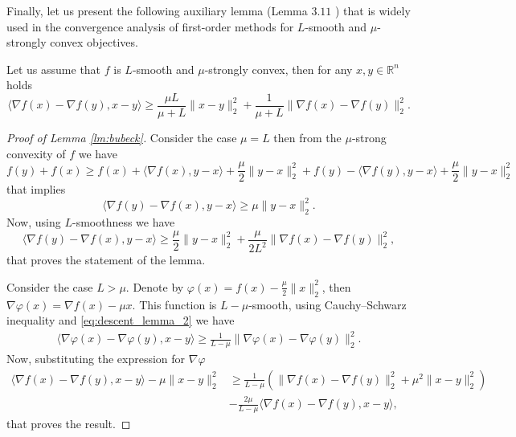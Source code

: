{\color{blue}
Finally, let us present the following auxiliary lemma (Lemma $3.11$ \cite{bubeck2015convex}) that is widely used in the convergence analysis of first-order methods for $L$-smooth and $\mu$-strongly convex objectives.

\begin{lemma}\label{lm:bubeck}
Let us assume that $f$ is $L$-smooth and $\mu$-strongly convex, then for any $x,y\in\mathbb{R}^n$ holds
\begin{equation}\label{eq:bubeck}
\langle \nabla f(x)- \nabla f(y), x - y\rangle\geq \frac{\mu L}{\mu + L}\|x-y\|_2^2 + \frac{1}{\mu + L}\|\nabla f(x) - \nabla f(y)\|_2^2.
\end{equation}
\end{lemma}
\begin{proof}[Proof of Lemma \ref{lm:bubeck}]
Consider the case $\mu = L$ then from the $\mu$-strong convexity of $f$ we have
$$
f(y) + f(x) \geq f(x) + \langle \nabla f(x), y-x\rangle + \frac{\mu}{2}\|y-x\|_2^2 + f(y) - \langle \nabla f(y), y-x\rangle + \frac{\mu}{2}\|y-x\|_2^2
$$
that implies 
\begin{equation}
    \langle \nabla f(y) - \nabla f(x), y-x\rangle\geq \mu\|y-x\|_2^2.
\end{equation}
Now, using $L$-smoothness we have
\begin{equation}
    \langle \nabla f(y) - \nabla f(x), y-x\rangle\geq \frac{\mu}{2}\|y-x\|_2^2 + \frac{\mu}{2L^2}\|\nabla f(x) - \nabla f(y)\|_2^2,
\end{equation}
that proves the statement of the lemma.

Consider the case $L>\mu$. Denote by $\varphi(x)=f(x) -\frac{\mu}{2}\|x\|_2^2$, then $\nabla \varphi(x) = \nabla f(x) - \mu x$. This function is $L-\mu$-smooth, using Cauchy–Schwarz inequality and \eqref{eq:descent_lemma_2} we have
\begin{align}
\langle \nabla\varphi(x) -\nabla\varphi(y), x-y\rangle\geq \frac{1}{L-\mu}\|\nabla \varphi(x) - \nabla \varphi(y)\|_2^2.
\end{align}
Now, substituting the expression for $\nabla \varphi$ 
\begin{align}
\langle \nabla f(x)- \nabla f(y), x - y\rangle - \mu\|x-y\|_2^2 &\geq \frac{1}{L-\mu}\left(\|\nabla f(x) - \nabla f(y)\|_2^2 + \mu^2\|x-y\|_2^2\right)\nonumber\\
&- \frac{2\mu}{L-\mu} \langle \nabla f(x)- \nabla f(y), x - y\rangle,
\end{align}
that proves the result.
\end{proof}
}